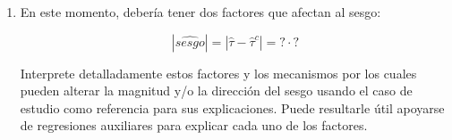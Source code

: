 \documentclass[a4paper, answers, addpoints, 11pt]{exam}
\newenvironment{solucion}{%
  \begin{mdframed}[
    backgroundcolor=blue!5,    %
    linecolor=blue!50,          %
    linewidth=2pt,              %
    leftmargin=10pt,            %
    rightmargin=8pt,           %
    topline=true,              %
    bottomline=true,            %
    roundcorner=10pt,           %
    innerleftmargin=10pt,       %
    innerrightmargin=10pt,      %
    innerbottommargin=10pt,     %
    innertopmargin=10pt         %
  ]%
  \begin{tcolorbox}[colframe=blue!50!black, colback=blue!50, coltitle=white, sharp corners=all, boxrule=1mm, width=\textwidth, halign=left, valign=center, top=0mm, bottom=0mm, left=0mm, right=0mm] \textbf{Solución} \end{tcolorbox} }{\end{mdframed}}
\begin{document}
\begin{enumerate} [resume]
\begin{solucion}
\begin{proof}
\begin{align*}
    \hat{\tau} &= \frac{\operatorname{cov}(\tilde{victim}, \tilde{peace})}{\operatorname{var}(\tilde{victim})} \qquad \text{(Por A1)}\\
    &= \frac{\operatorname{cov}(\tilde{victim}, \hat{\tau}^c \tilde{victim} + \hat{\gamma} \tilde{center})}{\operatorname{var}(\tilde{victim}_i)} \qquad \text{(Usando  la estimación de \ref{aniquilacionx})} \\
     &= \hat{\tau}^c \frac{\operatorname{var}(\tilde{victim})}{\operatorname{var}(\tilde{victim})} + \frac{\operatorname{cov}(\tilde{victim}, \hat{\gamma} \tilde{center})}{\operatorname{var}(\tilde{victim})} \\
    &= \hat{\tau}^c + \hat{\gamma} \left( \frac{\operatorname{cov}(\tilde{victim}, \tilde{center})}{\operatorname{var}(\tilde{victim})} \right) \\
    \intertext{Defina $ \hat{\delta} := \frac{\operatorname{cov}(\tilde{victim}, \tilde{center})}{\operatorname{var}(\tilde{victim})}$ entonces}
    &= \hat{\tau}^c+ \hat{\gamma} \hat{\delta}
\end{align*}
Luego hemos mostrado que $\hat{\tau} =\hat{\tau}^c+ \hat{\gamma} \hat{\delta}$. Por tanto $\hat{\tau}$ tiene un sesgo respecto a $\hat{\tau}^c$  y la magnitud va a depender de la correlación entre ser victima y estar en el centro (descontando ya el efecto de los controles).

    \end{proof}
        \end{solucion}

    \bigskip\item En este momento, debería tener dos factores que afectan al sesgo:
    
    \begin{equation}\label{eq:ovb}
        |\hat{sesgo}| = |\hat\tau - \hat\tau^c| = \mathord{?} \cdot \mathord{?}
    \end{equation}
    
    Interprete detalladamente estos factores y los mecanismos por los cuales pueden alterar la magnitud y/o la dirección del sesgo usando el caso de estudio como referencia para sus explicaciones. Puede resultarle útil apoyarse de regresiones auxiliares para explicar cada uno de los factores.


\end{enumerate}
\end{document}
